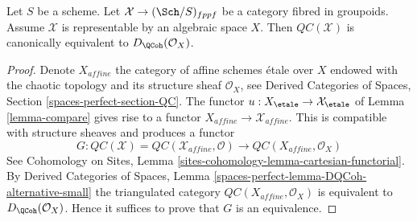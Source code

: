 %
\begin{proposition}
\label{proposition-QC-compare}
Let $S$ be a scheme. Let $\mathcal{X} \to (\Sch/S)_{fppf}$ be a category
fibred in groupoids. Assume $\mathcal{X}$ is representable by an algebraic
space $X$. Then $\mathit{QC}(\mathcal{X})$ is canonically equivalent to
$D_\QCoh(\mathcal{O}_X)$.
\end{proposition}

\begin{proof}
Denote $X_{affine}$ the category of affine schemes \'etale over $X$
endowed with the chaotic topology and its structure sheaf $\mathcal{O}_X$, see
Derived Categories of Spaces, Section \ref{spaces-perfect-section-QC}.
The functor $u : X_\etale \to \mathcal{X}_\etale$ of Lemma \ref{lemma-compare}
gives rise to a functor $X_{affine} \to \mathcal{X}_{affine}$.
This is compatible with structure sheaves and produces a functor
$$
G :
\mathit{QC}(\mathcal{X}) = \mathit{QC}(\mathcal{X}_{affine}, \mathcal{O})
\longrightarrow
\mathit{QC}(X_{affine}, \mathcal{O}_X)
$$
See
Cohomology on Sites, Lemma \ref{sites-cohomology-lemma-cartesian-functorial}.
By Derived Categories of Spaces, Lemma
\ref{spaces-perfect-lemma-DQCoh-alternative-small}
the triangulated category $\mathit{QC}(X_{affine}, \mathcal{O}_X)$
is equivalent to $D_\QCoh(\mathcal{O}_X)$. Hence it suffices to
prove that $G$ is an equivalence.


\end{proof}
